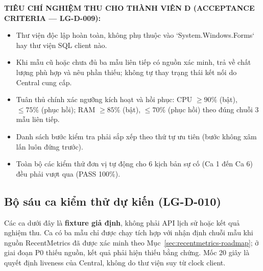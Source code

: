 \documentclass[12pt,a4paper]{article}
\begin{document}
\begin{checklistbox}
\textbf{TIÊU CHÍ NGHIỆM THU CHO THÀNH VIÊN D (ACCEPTANCE CRITERIA --- LG-D-009):}
\begin{itemize}[leftmargin=1.5em, itemsep=1pt]
  \item Thư viện độc lập hoàn toàn, không phụ thuộc vào `System.Windows.Forms` hay thư viện SQL client nào.
  \item Khi mẫu cũ hoặc chưa đủ ba mẫu liên tiếp có nguồn xác minh, trả về chất lượng phù hợp và nêu phần thiếu; không tự thay trạng thái kết nối do Central cung cấp.
  \item Tuân thủ chính xác ngưỡng kích hoạt và hồi phục: CPU $\ge 90\%$ (bật), $\le 75\%$ (phục hồi); RAM $\ge 85\%$ (bật), $\le 70\%$ (phục hồi) theo đúng chuỗi 3 mẫu liên tiếp.
  \item Danh sách bước kiểm tra phải sắp xếp theo thứ tự ưu tiên (bước không xâm lấn luôn đứng trước).
  \item Toàn bộ các kiểm thử đơn vị tự động cho 6 kịch bản sự cố (Ca 1 đến Ca 6) đều phải vượt qua (PASS 100\%).
\end{itemize}
\end{checklistbox}



\subsection{Bộ sáu ca kiểm thử dự kiến (LG-D-010)}
Các ca dưới đây là \textbf{fixture giả định}, không phải API lịch sử hoặc kết quả nghiệm thu. Ca có ba mẫu chỉ được chạy tích hợp với nhận định chuỗi mẫu khi nguồn RecentMetrics đã được xác minh theo Mục~\ref{sec:recentmetrics-roadmap}; ở giai đoạn P0 thiếu nguồn, kết quả phải hiện thiếu bằng chứng. Mốc 20 giây là quyết định liveness của Central, không do thư viện suy từ clock client.
\end{document}
